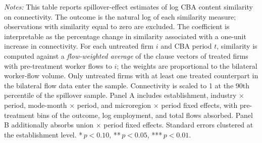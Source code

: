 \begin{table}[H]
\begin{minipage}{\linewidth}
\smallskip
\scriptsize\textit{Notes:} This table reports spillover-effect estimates of log CBA content similarity on connectivity. The outcome is the natural log of each similarity measure; observations with similarity equal to zero are excluded. The coefficient is interpretable as the percentage change in similarity associated with a one-unit increase in connectivity. For each untreated firm $i$ and CBA period $t$, similarity is computed against a \emph{flow-weighted average} of the clause vectors of treated firms with pre-treatment worker flows to $i$; the weights are proportional to the bilateral worker-flow volume. Only untreated firms with at least one treated counterpart in the bilateral flow data enter the sample. Connectivity is scaled to 1 at the 90th percentile of the spillover sample. Panel A includes establishment, industry $\times$ period, mode-month $\times$ period, and microregion $\times$ period fixed effects, with pre-treatment bins of the outcome, log employment, and total flows absorbed. Panel B additionally absorbs union $\times$ period fixed effects. Standard errors clustered at the establishment level. *\,$p<0.10$, **\,$p<0.05$, ***\,$p<0.01$.
\end{minipage}
\end{table}
